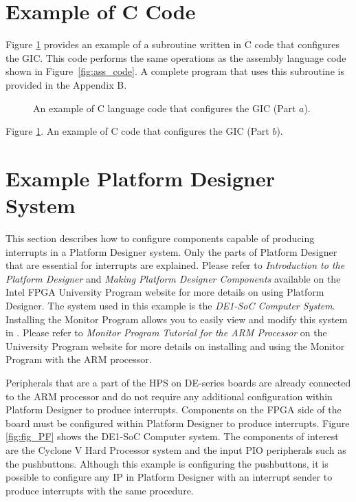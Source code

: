 \documentclass[11pt, twoside, pdftex]{article}
\begin{document}
\newpage
\section{Example of C Code}
\label{sec:C_code} Figure \ref{fig:C_code} provides an example of a subroutine written in
C code that configures the GIC. This code performs the same operations as the assembly
language code shown in Figure~\ref{fig:ass_code}.  A complete program that uses 
this subroutine is provided in the Appendix B.

\begin{figure}[h!]
\begin{center}

\end{center}
\caption{An example of C language code that configures the GIC (Part $a$).}
   \label{fig:C_code}
\end{figure}

\clearpage
\begin{center}

\end{center}
\begin{center}
Figure \ref{fig:C_code}. An example of C code that configures the GIC (Part $b$).
\end{center}

\newpage
\section{Example Platform Designer System}
\label{sec:PF_Sys} This section describes how to configure components capable of producing interrupts in a Platform Designer system. Only the parts of Platform Designer that are essential for interrupts are explained. Please refer to {\it Introduction to the Platform Designer} and {\it Making Platform Designer Components} available on the Intel FPGA University Program website for more details on using Platform Designer. The system used in this example is the {\it DE1-SoC Computer System}. Installing the  Monitor Program allows you to easily view and modify this system in . Please refer to {\it Monitor Program Tutorial for the ARM Processor} on the University Program website for more details on installing and using the Monitor Program with the ARM processor.

Peripherals that are a part of the HPS on DE-series boards are already connected to the ARM processor and do not require any additional configuration within Platform Designer to produce interrupts. Components on the FPGA side of the board must be configured within Platform Designer to produce interrupts. Figure \ref{fig:fig_PF} shows the DE1-SoC Computer system. The components of interest are
the Cyclone V Hard Processor system and the input PIO peripherals such as the pushbuttons. Although this example is configuring the pushbuttons, it is possible to configure any IP in Platform Designer with an interrupt sender to produce interrupts with the same procedure.
\end{document}
